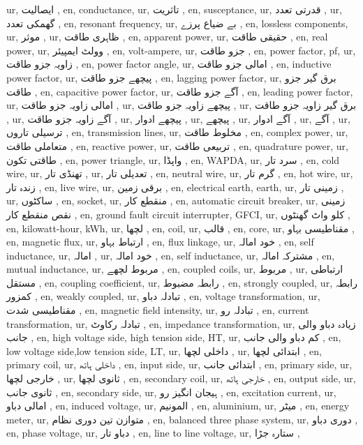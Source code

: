 ur, ایصالیت ,
en, conductance,
ur, تاثریت ,
en, susceptance,
ur, قدرتی تعدد ,
ur, گھمکی تعدد ,
en, resonant frequency,
ur, بے ضیاع پرزے ,
en, lossless components,
ur, موثر ,
ur, ظاہری طاقت ,
en, apparent power,
ur, حقیقی طاقت ,
en, real power,
ur, وولٹ ایمپیئر ,
en, volt-ampere,
ur, جزو طاقت ,
en, power factor, pf,
ur, زاویہ جزو طاقت ,
en, power factor angle,
ur, امالی جزو طاقت ,
en, inductive power factor,
ur, پیچھے جزو طاقت ,
en, lagging power factor,
ur, برق گیر جزو طاقت ,
en, capacitive power factor,
ur, آگے جزو طاقت ,
en, leading power factor,
ur, امالی زاویہ جزو طاقت ,
ur, پیچھے زاویہ جزو طاقت ,
ur, برق گیر زاویہ جزو طاقت ,
ur, آگے زاویہ جزو طاقت ,
ur, پیچھے ادوار ,
ur, پیچھے ,
ur, آگے ادوار ,
ur, آگے ,
ur, ترسیلی تاروں ,
en, transmission lines,
ur, مخلوط طاقت ,
en, complex power,
ur, متعاملی طاقت ,
en, reactive power,
ur, تربیعی طاقت ,
en, quadrature power,
ur, طاقتی تکون ,
en, power triangle,
ur, واپڈا ,
en, WAPDA,
ur, سرد تار ,
en, cold wire,
ur, تھنڈی تار ,
ur, تعدیلی تار ,
en, neutral wire,
ur, گرم تار ,
en, hot wire,
ur, زندہ تار ,
en, live wire,
ur, برقی زمین ,
en, electrical earth, earth,
ur, زمینی تار ,
ur, ساکٹوں ,
en, socket,
ur, منقطع کار ,
en, automatic circuit breaker,
ur, زمینی نقص منقطع کار ,
en, ground fault circuit interrupter, GFCI,
ur, کلو واٹ گھنٹوں ,
en, kilowatt-hour, kWh,
ur, لچھا ,
en, coil,
ur, قالب ,
en, core,
ur, مقناطیسی بہاو ,
en, magnetic flux,
ur, ارتباط بہاو ,
en, flux linkage,
ur, خود امالہ ,
en, self inductance,
ur, امالہ ,
ur, خود امالہ ,
en, self inductance,
ur, مشترکہ امالہ ,
en, mutual inductance,
ur, مربوط لچھے ,
en, coupled coils,
ur, مربوط ,
ur, ارتباطی مستقل ,
en, coupling coefficient,
ur, رابطہ مضبوط ,
en, strongly coupled,
ur, رابطہ کمزور ,
en, weakly coupled,
ur, تبادلہ دباو ,
en, voltage transformation,
ur, مقناطیسی شدت ,
en, magnetic field intensity,
ur, تبادلہ رو ,
en, current transformation,
ur, تبادلہ رکاوٹ ,
en, impedance transformation,
ur, زیادہ دباو والی جانب ,
en, high voltage side, high tension side, HT,
ur, کم دباو والی جانب ,
en, low voltage side,low tension side, LT,
ur, داخلی لچھا ,
ur, ابتدائی لچھا ,
en, primary coil,
ur, داخلی ہاتھ ,
en, input side,
ur, ابتدائی جانب ,
en, primary side,
ur, خارجی لچھا ,
ur, ثانوی لچھا ,
en, secondary coil,
ur, خارجی ہاتھ ,
en, output side,
ur, ثانوی جانب ,
en, secondary side,
ur, ہیجان انگیز رو ,
en, excitation current,
ur, امالی دباو ,
en, induced voltage,
ur, المونیم ,
en, aluminium,
ur, میٹر ,
en, energy meter,
ur, متوازن تین دوری نظام ,
en, balanced three phase system,
ur, دوری دباو ,
en, phase voltage,
ur, دباو تار ,
en, line to line voltage,
ur, ستارہ جڑا ,
